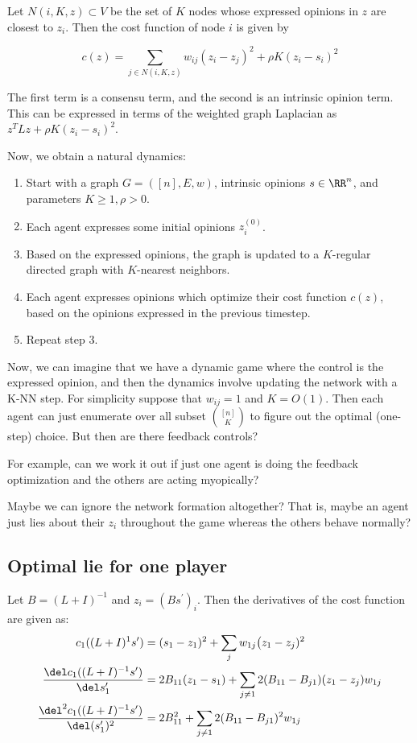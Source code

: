 Let $N(i, K, z) \subset V$ be the set of $K$ nodes whose expressed opinions in $z$ are closest to $z_i$. Then the cost function of node $i$ is given by

\[
c(z) = \sum\limits_{j \in N(i, K, z)} w_{ij} (z_i - z_j)^2 + \rho K (z_i - s_i)^2
\]

The first term is a consensu term, and the second is an intrinsic opinion term. This can be expressed in terms of the weighted graph Laplacian as $z^T L z + \rho K (z_i - s_i)^2$. 

Now, we obtain a natural dynamics: 
\begin{enumerate}
    \item Start with a graph $G = ([n], E, w)$, intrinsic opinions $s \in \RR^n$, and parameters $K \geq 1, \rho > 0$. 
    \item Each agent expresses some initial opinions $z_i^{(0)}$. 
    \item Based on the expressed opinions, the graph is updated to a $K$-regular directed graph with $K$-nearest neighbors. 
    \item Each agent expresses opinions which optimize their cost function $c(z)$, based on the opinions expressed in the previous timestep. 
    \item Repeat step 3. 
\end{enumerate}

Now, we can imagine that we have a dynamic game where the control is the expressed opinion, and then the dynamics involve updating the network with a K-NN step. For simplicity suppose that $w_{ij} = 1$ and $K = O(1)$. Then each agent can just enumerate over all subset $\binom{[n]}{K}$ to figure out the optimal (one-step) choice. But then are there feedback controls? 

For example, can we work it out if just one agent is doing the feedback optimization and the others are acting myopically? 

Maybe we can ignore the network formation altogether? That is, maybe an agent just lies about their $z_i$ throughout the game whereas the others behave normally? 

\subsection{Optimal lie for one player}


\begin{lemma}
Let $B = (L + I)^{-1}$ and  $z_i = (B s^\prime)_i$. Then the derivatives of the cost function are given as: 
\begin{align*}
c_1((L + I)^{1} s^\prime) &=
(s_1 - z_1)^2 
+ \sum_j w_{1j} \big(z_1 - z_j)^2 \\
\frac{\del c_1((L + I)^{-1} s^\prime)}{\del s_1^\prime}
&= 2 B_{11}(z_1 - s_1) + \sum_{j \neq 1} 2 (B_{11} - B_{j1})(z_{1} - z_{j}) w_{1j} \\
\frac{\del^2 c_1((L + I)^{-1} s^\prime)}{\del (s_1^\prime)^2} &=
2B_{11}^2 + \sum_{j \neq 1} 2 (B_{11} - B_{j1})^2 w_{1j}
\end{align*}
\end{lemma}\label{lemma:derivatives}

